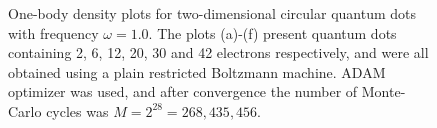 \begin{figure}
	\centering
	\hspace{-0.0cm}
	
	\hspace{-0.0cm}
	
	\caption{One-body density plots for two-dimensional circular quantum dots with frequency $\omega=1.0$. The plots (a)-(f) present quantum dots containing 2, 6, 12, 20, 30 and 42 electrons respectively, and were all obtained using a plain restricted Boltzmann machine. ADAM optimizer was used, and after convergence the number of Monte-Carlo cycles was $M=2^{28}=268,435,456$.}
	\label{fig:OB_interaction_VMC_1p0w2}
\end{figure}


